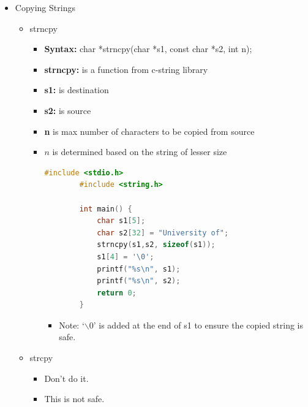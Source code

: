 \documentclass[12pt]{article}
\begin{document}
\begin{itemize}
    \item Copying Strings
    \begin{itemize}
        \item strncpy
        \begin{itemize}
            \item \textbf{Syntax:} char *strncpy(char *s1, const char *s2, int n);
            \item \textbf{strncpy:} is a function from c-string library
            \item \textbf{s1:} is destination
            \item \textbf{s2:} is source
            \item \textbf{n} is max number of characters to be copied from source
            \item $n$ is determined based on the string of lesser size

        \begin{lstlisting}[language=c,caption={strings\_example\_4.c}]
        #include <stdio.h>
        #include <string.h>

        int main() {
            char s1[5];
            char s2[32] = "University of";
            strncpy(s1,s2, sizeof(s1));
            s1[4] = '\0';
            printf("%s\n", s1);
            printf("%s\n", s2);
            return 0;
        }
        \end{lstlisting}

            \begin{itemize}
                \item Note: `$\backslash0$' is added at the end of s1 to ensure the
                copied string is safe.
            \end{itemize}
        \end{itemize}
        \item strcpy
        \begin{itemize}
            \item Don't do it.
            \item This is not safe.
        \end{itemize}
    \end{itemize}
\end{itemize}
\end{document}

